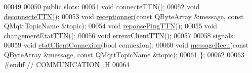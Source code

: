 \begin{DoxyCode}
00049 
00050     \textcolor{keyword}{public} slots:
00051         \textcolor{keywordtype}{void} \hyperlink{class_communication_af71587fb1ee9b7460345b7c12372a1eb}{connecteTTN}();
00052         \textcolor{keywordtype}{void} \hyperlink{class_communication_ab0f5a47c2fc7dbca198bfab2c0ac65bb}{deconnecteTTN}();
00053         \textcolor{keywordtype}{void} \hyperlink{class_communication_a9a0c0ce96c86cbb3e59529b2334819f3}{receptionner}(\textcolor{keyword}{const} QByteArray &message, \textcolor{keyword}{const} QMqttTopicName &topic);
00054         \textcolor{keywordtype}{void} \hyperlink{class_communication_a2921a3a80cdcb10f7f63c3bd779d7129}{reponsePingTTN}();
00055         \textcolor{keywordtype}{void} \hyperlink{class_communication_af249c498d61b4288b9e7d388baf81fc2}{changementEtatTTN}();
00056         \textcolor{keywordtype}{void} \hyperlink{class_communication_ae1a84ffd9317d0e4e27a6633cef43b64}{erreurClientTTN}();
00057 
00058     signals:
00059         \textcolor{keywordtype}{void} \hyperlink{class_communication_aa6100d6b2addece57f3e74c1140a3179}{etatClientConnexion}(\textcolor{keywordtype}{bool} connexion);
00060         \textcolor{keywordtype}{void} \hyperlink{class_communication_a83865ed4092e263f42669dff0582b7e1}{messageRecu}(\textcolor{keyword}{const} QByteArray &message, \textcolor{keyword}{const} QMqttTopicName &topic);
00061 \};
00062 
00063 \textcolor{preprocessor}{#endif // COMMUNICATION\_H}
00064 
\end{DoxyCode}
